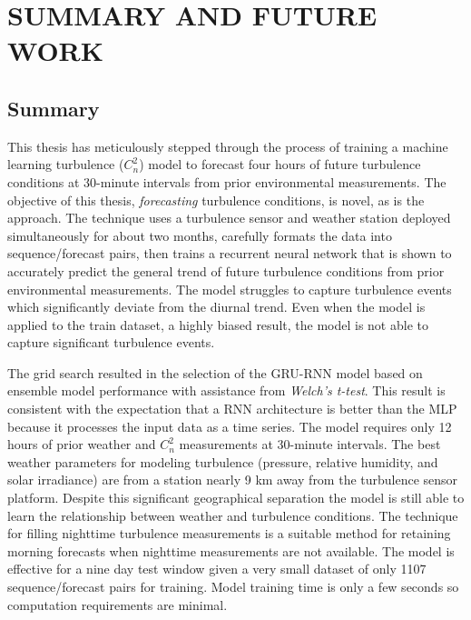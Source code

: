 \chapter{SUMMARY AND FUTURE WORK}
\label{ch6}

\section{Summary}
This thesis has meticulously stepped through the process of training a machine learning turbulence ($C_{n}^{2}$) model to forecast four hours of future turbulence conditions at 30-minute intervals from prior environmental measurements. The objective of this thesis, \emph{forecasting} turbulence conditions, is novel, as is the approach. The technique uses a turbulence sensor and weather station deployed simultaneously for about two months, carefully formats the data into sequence/forecast pairs, then trains a recurrent neural network that is shown to accurately predict the general trend of future turbulence conditions from prior environmental measurements. The model struggles to capture turbulence events which significantly deviate from the diurnal trend. Even when the model is applied to the train dataset, a highly biased result, the model is not able to capture significant turbulence events.

The grid search resulted in the selection of the \ac{GRU-RNN} model based on ensemble model performance with assistance from \textit{Welch's t-test}. This result is consistent with the expectation that a \ac{RNN} architecture is better than the \ac{MLP} because it processes the input data as a time series. The model requires only 12 hours of prior weather and $C_{n}^{2}$ measurements at 30-minute intervals. The best weather parameters for modeling turbulence (pressure, relative humidity, and solar irradiance) are from a station nearly 9 km away from the turbulence sensor platform. Despite this significant geographical separation the model is still able to learn the relationship between weather and turbulence conditions. The technique for filling nighttime turbulence measurements is a suitable method for retaining morning forecasts when nighttime measurements are not available. The model is effective for a nine day test window given a very small dataset of only 1107 sequence/forecast pairs for training. Model training time is only a few seconds so computation requirements are minimal.

